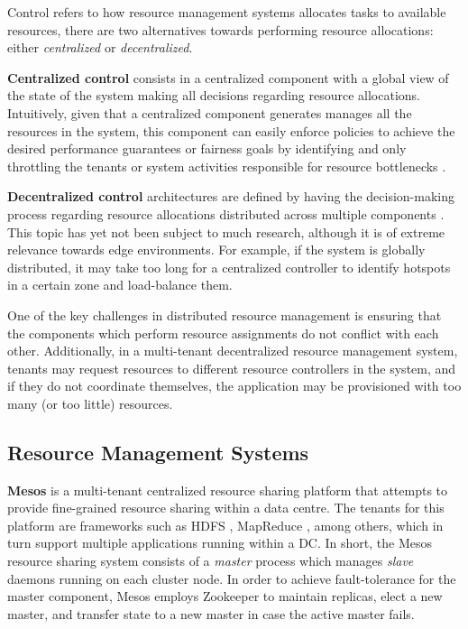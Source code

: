 Control refers to how resource management systems allocates tasks to available resources, there are two alternatives towards performing resource allocations: either \textit{centralized} or \textit{decentralized}.

\textbf{Centralized control} consists in a centralized component with a global view of the state of the system making all decisions regarding resource allocations. Intuitively, given that a centralized component generates manages all the resources in the system, this component can easily enforce policies to achieve the desired performance guarantees or fairness goals by identifying and only throttling the tenants or system activities responsible for resource bottlenecks \cite{verma2015large}.

\textbf{Decentralized control} architectures are defined by having the decision-making process regarding resource allocations distributed across multiple components \cite{Hong2019}. This topic has yet not been subject to much research, although it is of extreme relevance towards edge environments. For example, if the system is globally distributed, it may take too long for a centralized controller to identify hotspots in a certain zone and load-balance them.

One of the key challenges in distributed resource management is ensuring that the components which perform resource assignments do not conflict with each other. Additionally, in a multi-tenant decentralized resource management system, tenants may request resources to different resource controllers in the system, and if they do not coordinate themselves, the application may be provisioned with too many (or too little) resources.

\subsection{Resource Management Systems}

\textbf{Mesos} \cite{hindman2011mesos} is a multi-tenant centralized resource sharing platform that attempts to provide fine-grained resource sharing within a data centre. The tenants for this platform are frameworks such as HDFS \cite{borthakur2008hdfs}, MapReduce \cite{dean2008mapreduce}, among others, which in turn support multiple applications running within a DC. In short, the Mesos resource sharing system consists of a \textit{master} process which manages \textit{slave} daemons running on each cluster node. In order to achieve fault-tolerance for the master component, Mesos employs Zookeeper \cite{hunt2010zookeeper} to maintain replicas, elect a new master, and transfer state to a new master in case the active master fails.


